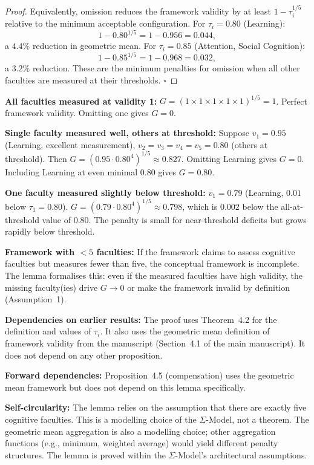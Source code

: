 \begin{proof}
Equivalently, omission reduces the framework validity by at least
$1 - \tau_i^{1/5}$ relative to the minimum acceptable configuration.
For $\tau_i = 0.80$ (Learning):
\[
1 - 0.80^{1/5} = 1 - 0.956 = 0.044,
\]
a $4.4\%$ reduction in geometric mean. For $\tau_i = 0.85$
(Attention, Social Cognition):
\[
1 - 0.85^{1/5} = 1 - 0.968 = 0.032,
\]
a $3.2\%$ reduction. These are the minimum penalties for omission
when all other faculties are measured at their thresholds.
$\square$
\end{proof}

\begin{boundary-case}
\textbf{All faculties measured at validity 1:}
$G = (1 \times 1 \times 1 \times 1 \times 1)^{1/5} = 1$. Perfect
framework validity. Omitting one gives $G = 0$.

\textbf{Single faculty measured well, others at threshold:}
Suppose $v_1 = 0.95$ (Learning, excellent measurement),
$v_2 = v_3 = v_4 = v_5 = 0.80$ (others at threshold).
Then $G = (0.95 \cdot 0.80^4)^{1/5} \approx 0.827$.
Omitting Learning gives $G = 0$. Including Learning at even minimal
$0.80$ gives $G = 0.80$.

\textbf{One faculty measured slightly below threshold:}
$v_1 = 0.79$ (Learning, $0.01$ below $\tau_1 = 0.80$).
$G = (0.79 \cdot 0.80^4)^{1/5} \approx 0.798$, which is $0.002$
below the all-at-threshold value of $0.80$. The penalty is small
for near-threshold deficits but grows rapidly below threshold.

\textbf{Framework with $< 5$ faculties:}
If the framework claims to assess cognitive faculties but measures
fewer than five, the conceptual framework is incomplete. The lemma
formalises this: even if the measured faculties have high validity,
the missing faculty(ies) drive $G \to 0$ or make the framework
invalid by definition (Assumption~1).
\end{boundary-case}

\begin{circularity-check}
\textbf{Dependencies on earlier results:} The proof uses
Theorem~4.2 for the definition and values of $\tau_i$. It also
uses the geometric mean definition of framework validity from
the manuscript (Section~4.1 of the main manuscript). It does not
depend on any other proposition.

\textbf{Forward dependencies:} Proposition~4.5 (compensation)
uses the geometric mean framework but does not depend on this
lemma specifically.

\textbf{Self-circularity:} The lemma relies on the assumption
that there are exactly five cognitive faculties. This is a
modelling choice of the $\Sigma$-Model, not a theorem. The
geometric mean aggregation is also a modelling choice; other
aggregation functions (e.g., minimum, weighted average) would
yield different penalty structures. The lemma is proved within
the $\Sigma$-Model's architectural assumptions.
\end{circularity-check}
